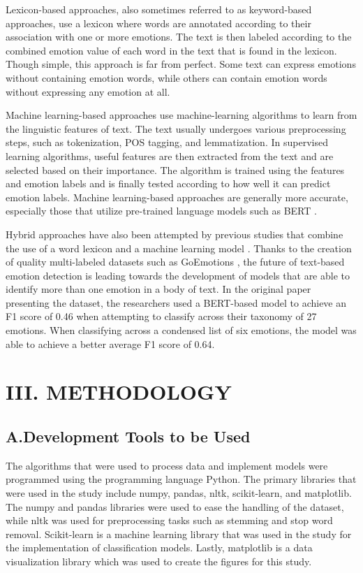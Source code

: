 \documentclass{icsthesis}
\begin{document}
\begin{mainmatter}
                Lexicon-based approaches, also sometimes referred to as keyword-based approaches, use a lexicon where words are annotated according to their association with one or more emotions. The text is then labeled according to the combined emotion value of each word in the text that is found in the lexicon. Though simple, this approach is far from perfect. Some text can express emotions without containing emotion words, while others can contain emotion words without expressing any emotion at all.
                
                Machine learning-based approaches use machine-learning algorithms to learn from the linguistic features of text. The text usually undergoes various preprocessing steps, such as tokenization, POS tagging, and lemmatization. In supervised learning algorithms, useful features are then extracted from the text and are selected based on their importance. The algorithm is trained using the features and emotion labels and is finally tested according to how well it can predict emotion labels. Machine learning-based approaches are generally more accurate, especially those that utilize pre-trained language models such as BERT \citep{Adoma1}.
                
                Hybrid approaches have also been attempted by previous studies that combine the use of a word lexicon and a machine learning model \citep{Murthy1}. Thanks to the creation of quality multi-labeled datasets such as GoEmotions \citep{Demszky1}, the future of text-based emotion detection is leading towards the development of models that are able to identify more than one emotion in a body of text. In the original paper presenting the dataset, the researchers used a BERT-based model to achieve an F1 score of 0.46 when attempting to classify across their taxonomy of 27 emotions. When classifying across a condensed list of six emotions, the model was able to achieve a better average F1 score of 0.64.
				
				
		
		\section{III. METHODOLOGY}
            \subsection{A.\hspace{0.5cm}Development Tools to be Used}
                The algorithms that were used to process data and implement models were programmed using the programming language Python. The primary libraries that were used in the study include numpy, pandas, nltk, scikit-learn, and matplotlib. The numpy and pandas libraries were used to ease the handling of the dataset, while nltk was used for preprocessing tasks such as stemming and stop word removal. Scikit-learn \citep{sklearn1} is a machine learning library that was used in the study for the implementation of classification models. Lastly, matplotlib is a data visualization library which was used to create the figures for this study.
                

\end{mainmatter}
\end{document}
